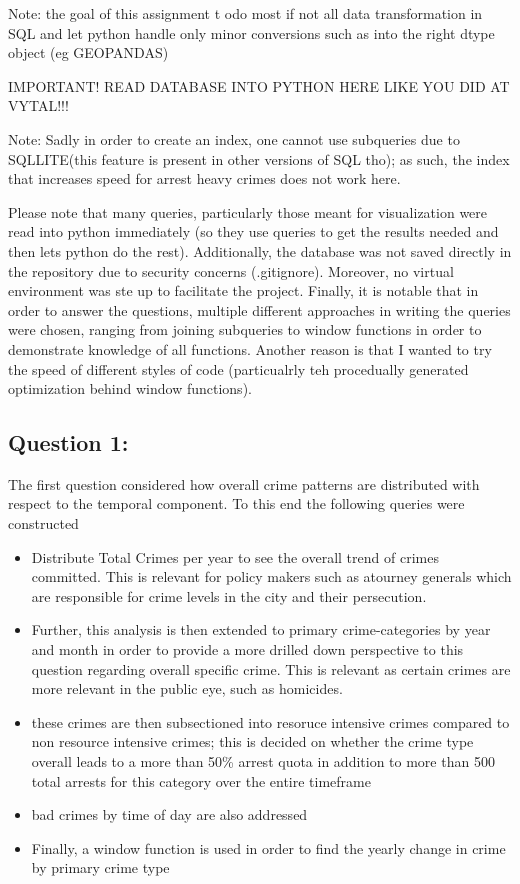 \documentclass[a4paper]{article}
\begin{document}
Note: the goal of this assignment t odo most if not all data transformation in SQL and let python handle only minor conversions such as into the right dtype object (eg GEOPANDAS)

IMPORTANT! READ DATABASE INTO PYTHON HERE LIKE YOU DID AT VYTAL!!!

Note: Sadly in order to create an index, one cannot use subqueries due to SQLLITE(this feature is present in other versions of SQL tho); as such, the index that increases speed for arrest heavy crimes does not work here. 


Please note that many queries, particularly those meant for visualization were read into python immediately (so they use queries to get the results needed and then lets python do the rest). Additionally, the database was not saved directly in the repository due to security concerns (.gitignore). Moreover, no virtual environment was ste up to facilitate the project. Finally, it is notable that in order to answer the questions, multiple different approaches in writing the queries were chosen, ranging from joining subqueries to window functions in order to demonstrate knowledge of all functions. Another reason is that I wanted to try the speed of different styles of code (particualrly teh procedually generated optimization behind window functions).

\subsection{Question 1:}

The first question considered how overall crime patterns are distributed with respect to the temporal component. To this end the following queries were constructed 
\begin{itemize}
  \item Distribute Total Crimes per year to see the overall trend of crimes committed. This is relevant for policy makers such as atourney generals which are responsible for crime levels in the city and their persecution. 
  \item Further, this analysis is then extended to primary crime-categories by year and month in order to provide a more drilled down perspective to this question regarding overall specific crime. This is relevant as certain crimes are more relevant in the public eye, such as homicides. 
  \item these crimes are then subsectioned into resoruce intensive crimes compared to non resource intensive crimes; this is decided on whether the crime type overall leads to a more than 50\% arrest quota in addition to more than 500 total arrests for this category over the entire timeframe
  \item bad crimes by time of day are also addressed 
  \item Finally, a window function is used in order to find the yearly change in crime by primary crime type 
\end{itemize}
\end{document}
